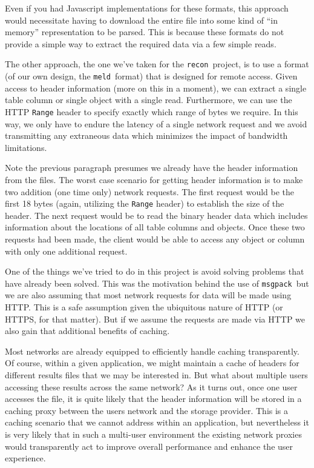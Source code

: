 \documentclass[11pt,a4paper,twocolumn]{article}
\newcommand{\recon}{\texttt{recon}}
\newcommand{\meld}{\texttt{meld}}
\newcommand{\msgpack}{\texttt{msgpack}}
\newcommand{\code}[1]{\texttt{#1}} %
\begin{document}
Even if you had Javascript implementations for these formats, this
approach would necessitate having to download the entire file into
some kind of ``in memory'' representation to be parsed.  This is
because these formats do not provide a simple way to extract the
required data via a few simple reads.

The other approach, the one we've taken for the \recon\ project, is to
use a format (of our own design, the \meld\ format) that is designed
for remote access.  Given access to header information (more on this
in a moment), we can extract a single table column or single object
with a single read.  Furthermore, we can use the HTTP \code{Range}
header to specify exactly which range of bytes we require.  In this
way, we only have to endure the latency of a single network request
and we avoid transmitting any extraneous data which minimizes the
impact of bandwidth limitations.


Note the previous paragraph presumes we already have the header
information from the files.  The worst case scenario for getting
header information is to make two addition (one time only) network
requests.  The first request would be the first 18 bytes (again,
utilizing the \code{Range} header) to establish the size of the
header.  The next request would be to read the binary header data
which includes information about the locations of all table columns
and objects.  Once these two requests had been made, the client would
be able to access any object or column with only one additional
request.


One of the things we've tried to do in this project is avoid solving
problems that have already been solved.  This was the motivation
behind the use of \msgpack\ but we are also assuming that most network
requests for data will be made using HTTP.  This is a safe assumption
given the ubiquitous nature of HTTP (or HTTPS, for that matter).  But
if we assume the requests are made via HTTP we also gain that
additional benefits of caching.

Most networks are already equipped to efficiently handle caching
transparently.  Of course, within a given application, we might
maintain a cache of headers for different results files that we may be
interested in.  But what about multiple users accessing these results
across the same network?  As it turns out, once one user accesses the
file, it is quite likely that the header information will be stored in
a caching proxy between the users network and the storage provider.
This is a caching scenario that we cannot address within an
application, but nevertheless it is very likely that in such a
multi-user environment the existing network proxies would
transparently act to improve overall performance and enhance the user
experience.
\end{document}
